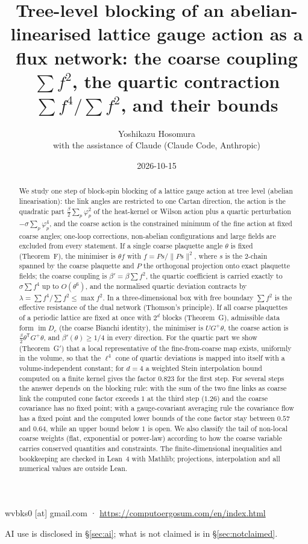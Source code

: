 \documentclass[11pt,a4paper]{article}
\title{Tree-level blocking of an abelian-linearised lattice gauge action as a flux network: the coarse coupling $\sum f^2$, the quartic contraction $\sum f^4/\sum f^2$, and their bounds}
\author{Yoshikazu Hosomura\\[.3em]\normalsize with the assistance of Claude (Claude Code, Anthropic)}
\date{2026-10-15}
\theoremstyle{definition}
\theoremstyle{remark}
\newcommand{\im}{\operatorname{im}}
\begin{document}
\maketitle
\begin{center}\small wvbks0 [at] gmail.com · \url{https://computoergosum.com/en/index.html}\end{center}
\begin{center}\small AI use is disclosed in \S\ref{sec:ai}; what is not claimed is in \S\ref{sec:notclaimed}.\end{center}

\begin{abstract}
We study one step of block-spin blocking of a lattice gauge action at tree level (abelian linearisation): the link angles are restricted to one Cartan direction, the action is the quadratic part $\frac{\beta}{2}\sum_p\varphi_p^2$ of the heat-kernel or Wilson action plus a quartic perturbation $-\sigma\sum_p\varphi_p^4$, and the coarse action is the constrained minimum of the fine action at fixed coarse angles; one-loop corrections, non-abelian configurations and large fields are excluded from every statement.
If a single coarse plaquette angle $\theta$ is fixed (Theorem~F), the minimiser is $\theta f$ with $f=Ps/\|Ps\|^2$, where $s$ is the $2$-chain spanned by the coarse plaquette and $P$ the orthogonal projection onto exact plaquette fields; the coarse coupling is $\beta'=\beta\sum f^2$, the quartic coefficient is carried exactly to $\sigma\sum f^4$ up to $O(\theta^6)$, and the normalised quartic deviation contracts by $\lambda=\sum f^4/\sum f^2\le\max f^2$.
In a three-dimensional box with free boundary $\sum f^2$ is the effective resistance of the dual network (Thomson's principle).
If all coarse plaquettes of a periodic lattice are fixed at once with $2^d$ blocks (Theorem~G), admissible data form $\im D_c$ (the coarse Bianchi identity), the minimiser is $UG^{+}\theta$, the coarse action is $\frac\beta2\theta^{\mathsf T}G^{+}\theta$, and $\beta'(\theta)\ge 1/4$ in every direction.
For the quartic part we show (Theorem~G$'$) that a local representative of the fine-from-coarse map exists, uniformly in the volume, so that the $\ell^4$ cone of quartic deviations is mapped into itself with a volume-independent constant; for $d=4$ a weighted Stein interpolation bound computed on a finite kernel gives the factor $0.823$ for the first step.
For several steps the answer depends on the blocking rule: with the sum of the two fine links as coarse link the computed cone factor exceeds $1$ at the third step ($1.26$) and the coarse covariance has no fixed point; with a gauge-covariant averaging rule the covariance flow has a fixed point and the computed lower bounds of the cone factor stay between $0.57$ and $0.64$, while an upper bound below $1$ is open.
We also classify the tail of non-local coarse weights (flat, exponential or power-law) according to how the coarse variable carries conserved quantities and constraints.
The finite-dimensional inequalities and bookkeeping are checked in Lean~4 with Mathlib; projections, interpolation and all numerical values are outside Lean.
\end{abstract}
\end{document}
